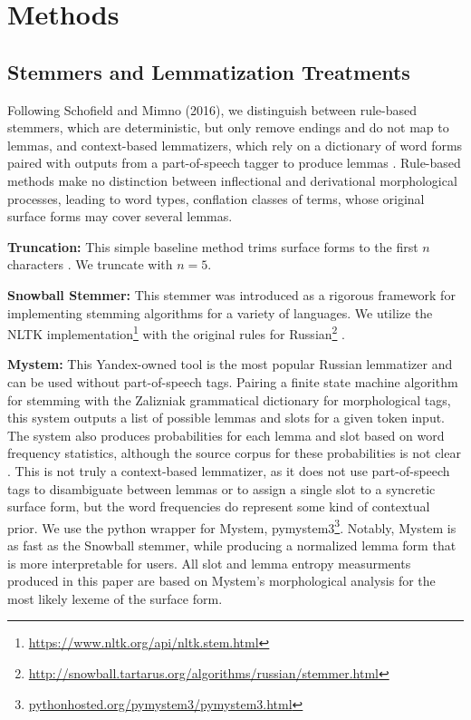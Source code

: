 \documentclass[11pt,a4paper]{article}
\begin{document}
\section{Methods}
\subsection{Stemmers and Lemmatization Treatments}
\label{sec:stemmers}
Following Schofield and Mimno (2016), we distinguish between rule-based stemmers, which are deterministic, but only remove endings and do not map to lemmas, and context-based lemmatizers, which rely on a dictionary of word forms paired with outputs from a part-of-speech tagger to produce lemmas \cite{schofield-mimno-2016-comparing,Sharoff2011ThePP}. Rule-based methods make no distinction between inflectional and derivational morphological processes, leading to word types, conflation classes of terms, whose original surface forms may cover several lemmas.

\textbf{Truncation:} This simple baseline method trims surface forms to the first $n$ characters \cite{schofield-mimno-2016-comparing}. We truncate with $n=5$.

\textbf{Snowball Stemmer:} This stemmer was introduced as a rigorous framework for implementing stemming algorithms for a variety of languages. We utilize the NLTK implementation\footnote{\url{https://www.nltk.org/api/nltk.stem.html}} with the original rules for Russian\footnote{\url{http://snowball.tartarus.org/algorithms/russian/stemmer.html}} \cite{snowball}.


\textbf{Mystem:} This Yandex-owned tool is the most popular Russian lemmatizer and can be used without part-of-speech tags. Pairing a finite state machine algorithm for stemming with the Zalizniak grammatical dictionary for morphological tags, this system outputs a list of possible lemmas and slots for a given token input. The system also produces probabilities for each lemma and slot based on word frequency statistics, although the source corpus for these probabilities is not clear \cite{Segalovich2003AFM}. This is not truly a context-based lemmatizer, as it does not use part-of-speech tags to disambiguate between lemmas or to assign a single slot to a syncretic surface form, but the word frequencies do represent some kind of contextual prior. We use the python wrapper for Mystem, pymystem3\footnote{\url{pythonhosted.org/pymystem3/pymystem3.html}}. Notably, Mystem is as fast as the Snowball stemmer, while producing a normalized lemma form that is more interpretable for users. All slot and lemma entropy measurments produced in this paper are based on Mystem's morphological analysis for the most likely lexeme of the surface form.
\end{document}
